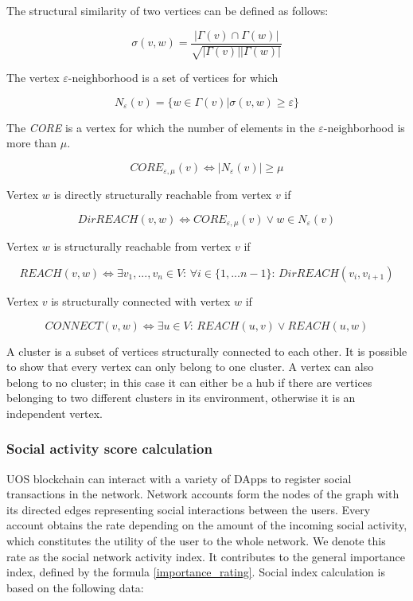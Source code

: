 \documentclass[a4paper,12pt]{article}
\begin{document}
The structural similarity of two vertices can be defined as follows:



$$
\sigma(v,w)=\frac{ |\Gamma(v) \cap \Gamma(w)|}{\sqrt{|\Gamma(v)||\Gamma(w)|}}
$$

The vertex $\varepsilon$-neighborhood is a set of vertices for which


$$
N_{\varepsilon}(v) = \{ w \in \Gamma(v) | \sigma(v,w) \ge \varepsilon \}
$$

The \textit{CORE} is a vertex for which the number of elements in the $\varepsilon$-neighborhood is more than $\mu$.

$$
CORE_{\varepsilon,\mu}(v) \Leftrightarrow |N_{\varepsilon} (v)| \ge \mu
$$

Vertex $w$ is directly structurally reachable from vertex $v$ if



$$
DirREACH(v,w) \Leftrightarrow CORE_{\varepsilon,\mu}(v) \vee w \in N_{\varepsilon}(v)
$$

Vertex $w$ is structurally reachable from vertex $v$ if


$$
REACH(v,w) \Leftrightarrow \exists v_1,...,v_n \in V \text{: } \forall i \in \{1,...n-1\} \text{: } DirREACH(v_i,v_{i+1})
$$

Vertex $v$ is structurally connected with vertex $w$ if



$$
CONNECT(v,w) \Leftrightarrow \exists u \in V\text{: } REACH(u,v) \vee REACH(u,w)
$$

A cluster is a subset of vertices structurally connected to each other. It is possible to show that every vertex can only belong to one cluster. A vertex can also belong to no cluster; in this case it can either be a hub if there are vertices belonging to two different clusters in its environment, otherwise it is an independent vertex.




\subsubsection{Social activity score calculation}

U{\degree}OS blockchain can interact with a variety of DApps to register social transactions in the network. Network accounts form the nodes of the graph with its directed edges representing social interactions between the users. Every account obtains the rate depending on the amount of the incoming social activity, which constitutes the utility of the user to the whole network. We denote this rate as the social network activity index. It contributes to the general importance index, defined by the formula \ref{importance_rating}. Social index calculation is based on the following data:
	
\end{document}

